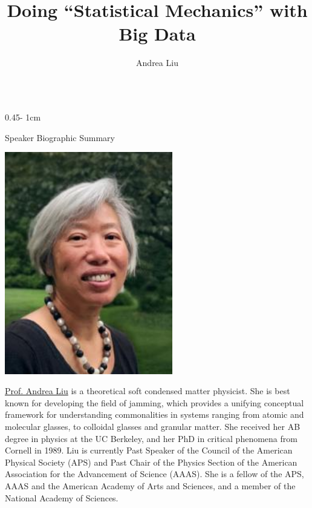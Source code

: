 \documentclass{../psuposter}
\title{Doing “Statistical Mechanics” with Big Data}
\author{Andrea Liu}
\institute{University of Pennsylvania}
\begin{document}
\begin{frame}
\begin{columns}[t, totalwidth=\textwidth]
\begin{column}{0.45\textwidth - 1cm}


    \begin{block}{Speaker Biographic Summary}
    	\begin{center}
    		\includegraphics[width=0.55\textwidth]{images/portrait}
    	\end{center}
    	\href{https://www.physics.upenn.edu/people/standing-faculty/andrea-liu}{Prof. Andrea Liu} is a theoretical soft condensed matter physicist. She is best known for developing the field of jamming, which provides a unifying conceptual framework for understanding commonalities in systems ranging from atomic and molecular glasses, to colloidal glasses and granular matter. 
    	She received her AB degree in physics at the UC Berkeley, and her PhD in critical phenomena from Cornell in 1989. 
    	Liu is currently Past Speaker of the Council of the American Physical Society (APS) and Past Chair of the Physics Section of the American Association for the Advancement of Science (AAAS). 
    	She is a fellow of the APS, AAAS and the American Academy of Arts and Sciences, and a member of the National Academy of Sciences.
    \end{block}



\end{column}
\end{columns}
\end{frame}
\end{document}
